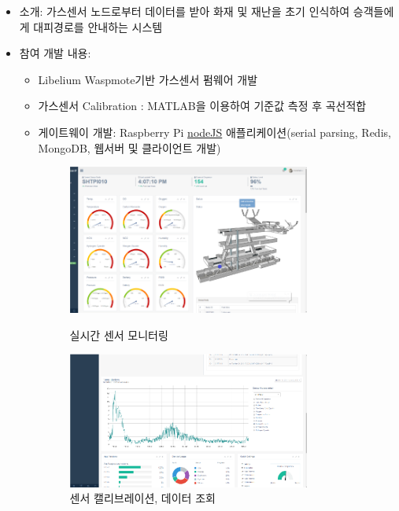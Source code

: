 \begin{itemize}
	\item 소개: 가스센서 노드로부터 데이터를 받아 화재 및 재난을 초기 인식하여 승객들에게 대피경로를 안내하는 시스템
	\item 참여 개발 내용:
	      \begin{itemize}
		      \item Libelium Waspmote기반 가스센서 펌웨어 개발
		      \item 가스센서 Calibration : MATLAB을 이용하여 기준값 측정 후 곡선적합
		      \item 게이트웨이 개발: Raspberry Pi \href{https://nodejs.org}{nodeJS} 애플리케이션(serial parsing, Redis, MongoDB, 웹서버 및 클라이언트 개발)

		            \begin{figure}[!ht]
			            \begin{fullwidth}
				            \centering
				            \parbox{0.8\textwidth}{
					            \includegraphics[width=0.8\textwidth]{images/m2m_01.png}
					            \caption*{실시간 센서 모니터링}
				            }\qquad
				            \parbox{0.8\textwidth}{
					            \includegraphics[width=0.8\textwidth]{images/m2m_02.png}
					            \caption*{센서 캘리브레이션, 데이터 조회}
				            }
			            \end{fullwidth}

\end{figure}
\end{itemize}
\end{itemize}

